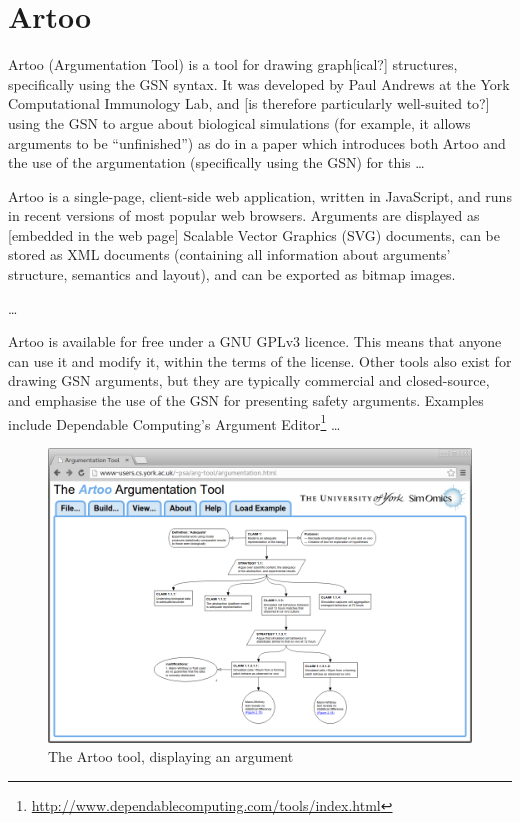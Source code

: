\section{Artoo}

Artoo (Argumentation Tool) is a tool for drawing graph[ical?] structures, specifically using the GSN syntax. It was developed by Paul Andrews at the York Computational Immunology Lab, and [is therefore particularly well-suited to?] using the GSN to argue about biological simulations (for example, it allows arguments to be ``unfinished'') as \citet{royal} do in a paper which introduces both Artoo and the use of the argumentation (specifically using the GSN) for this \ldots {}

Artoo is a single-page, client-side web application, written in JavaScript, and runs in recent versions of most popular web browsers. Arguments are displayed as [embedded in the web page] Scalable Vector Graphics (SVG) documents, can be stored as XML documents (containing all information about arguments' structure, semantics and layout), and can be exported as bitmap images.

\ldots

Artoo is available for free under a GNU GPLv3 licence.
This means that anyone can use it and modify it, within the terms of the license.
Other tools also exist for drawing GSN arguments, but they are typically commercial and closed-source, and emphasise the use of the GSN for presenting safety arguments.
Examples include Dependable Computing's Argument Editor\footnote{\url{http://www.dependablecomputing.com/tools/index.html}} \ldots

\begin{figure}
  \centering
  \includegraphics[width=\textwidth]{graphics/artoo_screenshot.png}
  \caption{The Artoo tool, displaying an argument}
\end{figure}

